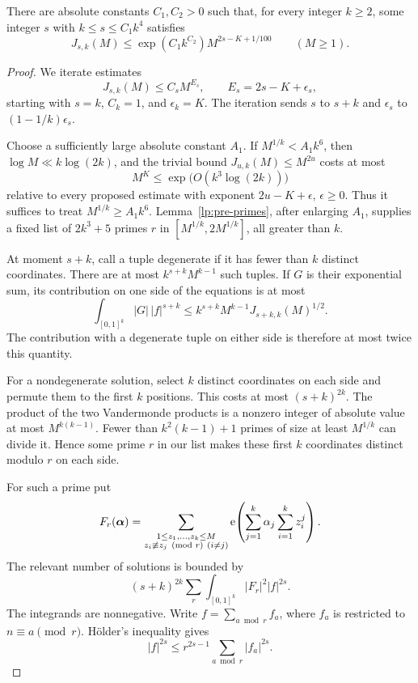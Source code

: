 \begin{lemma}\label{lp:mean-value}
There are absolute constants $C_1,C_2>0$ such that, for every integer
$k\ge2$, some integer $s$ with $k\le s\le C_1k^4$ satisfies
\begin{equation}\label{lp:mean-value-bound}
 J_{s,k}(M)\le \exp(C_1k^{C_2})M^{2s-K+1/100}
 \qquad(M\ge1).
\end{equation}
\end{lemma}

\begin{proof}
We iterate estimates
\begin{equation}\label{lp:inductive-bound}
 J_{s,k}(M)\le C_s M^{E_s},\qquad
 E_s=2s-K+\epsilon_s,
\end{equation}
starting with $s=k$, $C_k=1$, and $\epsilon_k=K$.  The iteration sends
$s$ to $s+k$ and $\epsilon_s$ to $(1-1/k)\epsilon_s$.

Choose a sufficiently large absolute constant $A_1$.  If
$M^{1/k}<A_1k^6$, then $\log M\ll k\log(2k)$, and the trivial bound
$J_{u,k}(M)\le M^{2u}$ costs at most
\begin{equation}\label{lp:small-M-cost}
 M^K\le\exp\bigl(O(k^3\log(2k))\bigr)
\end{equation}
relative to every proposed estimate with exponent $2u-K+\epsilon$,
$\epsilon\ge0$.  Thus it suffices to treat $M^{1/k}\ge A_1k^6$.
Lemma~\ref{lp:pre-primes}, after enlarging
$A_1$, supplies a fixed list of
$2k^3+5$ primes $r$ in $[M^{1/k},2M^{1/k}]$, all greater than $k$.

At moment $s+k$, call a tuple degenerate if it has fewer than $k$
distinct coordinates.  There are at most
$k^{s+k}M^{k-1}$ such tuples.  If $G$ is their exponential sum, its
contribution on one side of the equations is at most
\[
 \int_{[0,1]^k}|G|\,|f|^{s+k}
 \le k^{s+k}M^{k-1}J_{s+k,k}(M)^{1/2}.
\]
The contribution with a degenerate tuple on either side is therefore at
most twice this quantity.

For a nondegenerate solution, select $k$ distinct coordinates on each side
and permute them to the first $k$ positions.  This costs at most
$(s+k)^{2k}$.  The product of the two Vandermonde products is a nonzero
integer of absolute value at most $M^{k(k-1)}$.  Fewer than $k^2(k-1)+1$
primes of size at least $M^{1/k}$ can divide it.  Hence some prime $r$ in
our list makes these first $k$ coordinates distinct modulo $r$ on each
side.

For such a prime put
\[
 F_r(\boldsymbol\alpha)=
 \sum_{\substack{1\le z_1,\ldots,z_k\le M\\
                  z_i\not\equiv z_j\pmod r\ (i\ne j)}}
 \mathrm{e}\!\left(\sum_{j=1}^k\alpha_j\sum_{i=1}^kz_i^j\right).
\]
The relevant number of solutions is bounded by
\[
 (s+k)^{2k}\sum_r\int_{[0,1]^k}|F_r|^2|f|^{2s}.
\]
The integrands are nonnegative.  Write $f=\sum_{a\bmod r}f_a$, where
$f_a$ is restricted to $n\equiv a\pmod r$.  H\"older's inequality gives
\[
 |f|^{2s}\le r^{2s-1}\sum_{a\bmod r}|f_a|^{2s}.
\]


\end{proof}
